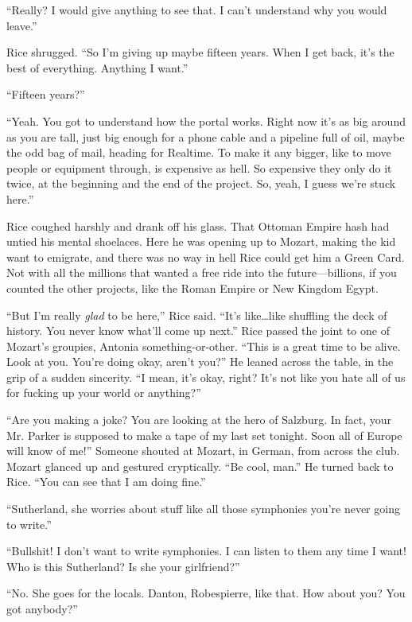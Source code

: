 ``Really? I would give anything to see that. I can't understand why you would leave.''

Rice shrugged. ``So I'm giving up maybe fifteen years. When I get back, it's the best of everything. Anything I want.''

``Fifteen years?''

``Yeah. You got to understand how the portal works. Right now it's as big around as you are tall, just big enough for a phone cable and a pipeline full of oil, maybe the odd bag of mail, heading for Realtime. To make it any bigger, like to move people or equipment through, is expensive as hell. So expensive they only do it twice, at the beginning and the end of the project. So, yeah, I guess we're stuck here.''

Rice coughed harshly and drank off his glass. That Ottoman Empire hash had untied his mental shoelaces. Here he was opening up to Mozart, making the kid want to emigrate, and there was no way in hell Rice could get him a Green Card. Not with all the millions that wanted a free ride into the future—billions, if you counted the other projects, like the Roman Empire or New Kingdom Egypt.

``But I'm really \textit{glad} to be here,'' Rice said. ``It's like\ldots like shuffling the deck of history. You never know what'll come up next.'' Rice passed the joint to one of Mozart's groupies, Antonia something-or-other. ``This is a great time to be alive. Look at you. You're doing okay, aren't you?'' He leaned across the table, in the grip of a sudden sincerity. ``I mean, it's okay, right? It's not like you hate all of us for fucking up your world or anything?''

``Are you making a joke? You are looking at the hero of Salzburg. In fact, your Mr. Parker is supposed to make a tape of my last set tonight. Soon all of Europe will know of me!'' Someone shouted at Mozart, in German, from across the club. Mozart glanced up and gestured cryptically. ``Be cool, man.'' He turned back to Rice. ``You can see that I am doing fine.''

``Sutherland, she worries about stuff like all those symphonies you're never going to write.''

``Bullshit! I don't want to write symphonies. I can listen to them any time I want! Who is this Sutherland? Is she your girlfriend?''

``No. She goes for the locals. Danton, Robespierre, like that. How about you? You got anybody?''

